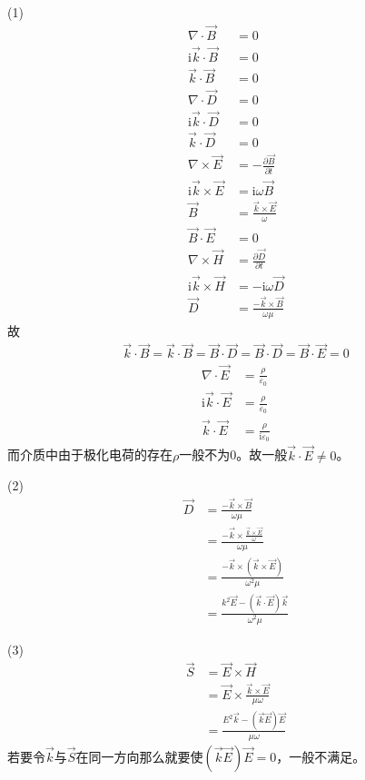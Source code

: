 \documentclass{phyasgn}
\renewcommand{\i}{\mathrm{i}}
\begin{document}
\begin{sol}[2]
    (1)
    \begin{align*}
        \nabla\cdot\vec{B}&=0\\
        \i \vec{k}\cdot\vec{B}&=0\\
        \vec{k}\cdot\vec{B}&=0\\
        \nabla\cdot\vec{D}&=0\\
        \i \vec{k}\cdot\vec{D}&=0\\
        \vec{k}\cdot\vec{D}&=0\\
        \nabla\times\vec{E}&=-\frac{\partial \vec{B}}{\partial t}\\
        \i\vec{k}\times\vec{E}&=\i\omega\vec{B}\\
        \vec{B}&=\frac{\vec{k}\times\vec{E}}{\omega}\\
        \vec{B}\cdot\vec{E}&=0\\
        \nabla\times\vec{H}&=\frac{\partial \vec{D}}{\partial t}\\
        \i\vec{k}\times\vec{H}&=-\i\omega\vec{D}\\
        \vec{D}&=\frac{-\vec{k}\times\vec{B}}{\omega\mu}
    \end{align*}
    故
    \begin{align*}
        \vec{k}\cdot\vec{B}=\vec{k}\cdot\vec{B}=\vec{B}\cdot\vec{D}=\vec{B}\cdot\vec{D}=\vec{B}\cdot\vec{E}=0
    \end{align*}
    \begin{align*}
        \nabla\cdot\vec{E}&=\frac{\rho}{\varepsilon_0}\\
        \i\vec{k}\cdot\vec{E}&=\frac{\rho}{\varepsilon_0}\\
        \vec{k}\cdot\vec{E}&=\frac{\rho}{\i\varepsilon_0}
    \end{align*}
    而介质中由于极化电荷的存在$\rho$一般不为0。故一般$\vec{k}\cdot\vec{E}\neq0$。

    (2)\begin{align*}
        \vec{D}&=\frac{-\vec{k}\times\vec{B}}{\omega\mu}\\
        &=\frac{-\vec{k}\times\frac{\vec{k}\times\vec{E}}{\omega}}{\omega\mu}\\
        &=\frac{-\vec{k}\times(\vec{k}\times\vec{E})}{\omega^2\mu}\\
        &=\frac{k^2\vec{E}-(\vec{k}\cdot\vec{E})\vec{k}}{\omega^2\mu}
    \end{align*}

    (3)\begin{align*}
        \vec{S}&=\vec{E}\times\vec{H}\\
        &=\vec{E}\times\frac{\vec{k}\times\vec{E}}{\mu\omega}\\
        &=\frac{E^2\vec{k}-(\vec{k}\vec{E})\vec{E}}{\mu\omega}
    \end{align*}
    若要令$\vec{k}$与$\vec{S}$在同一方向那么就要使$(\vec{k}\vec{E})\vec{E}=0$，一般不满足。
\end{sol}
\end{document}
